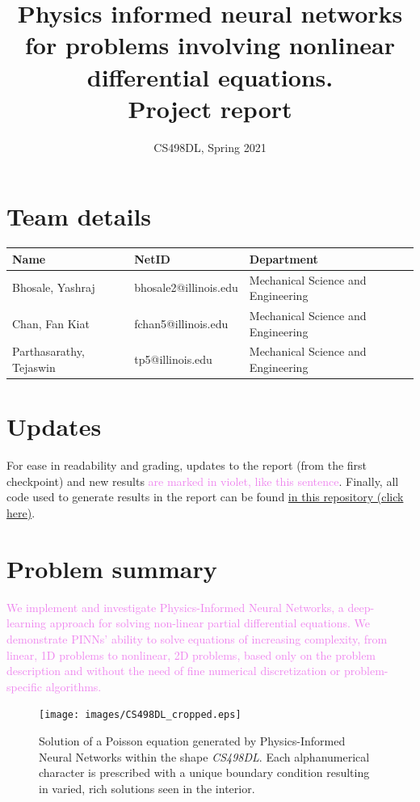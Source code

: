 \documentclass[11pt]{article}
\author{CS498DL, Spring 2021}
\date{}
\title{Physics informed neural networks for problems involving nonlinear differential equations.\\\medskip
\large Project report}
\newcommand{\newcontent}[1]{\textcolor{violet}{#1}}
\begin{document}
\maketitle

\section{Team details}
\label{sec:org6c892e9}
\begin{center}
\begin{tabular}{lll}
\toprule
Name & NetID & Department\\
\midrule
Bhosale, Yashraj & bhosale2@illinois.edu & Mechanical Science and Engineering\\
Chan, Fan Kiat & fchan5@illinois.edu & Mechanical Science and Engineering\\
Parthasarathy, Tejaswin & tp5@illinois.edu & Mechanical Science and Engineering\\
\bottomrule
\end{tabular}
\end{center}

\section{Updates}
\label{sec:org69da6f5}
For ease in readability and grading, updates to the report (from the first
checkpoint) and new results \newcontent{are marked in violet, like this}
\newcontent{sentence}. Finally, all code used to generate results in the report can be
found \href{https://github.com/fankiat/CS498DL-project}{in this repository (click here)}.

\section{Problem summary}
\label{sec:org6a1aaa6}
\newcontent{
We implement and investigate Physics-Informed Neural Networks, a deep-learning approach for solving non-linear
partial differential equations. We demonstrate PINNs' ability to solve
equations of increasing complexity, from linear, 1D problems to nonlinear, 2D
problems, based only on the problem description and without the need of fine
numerical discretization or problem-specific algorithms.
}

\begin{figure}[htbp]
\centering
\texttt{[image: images/CS498DL\_cropped.eps]}
\caption{\label{fig:cs498_poisson_results}Solution of a Poisson equation generated by Physics-Informed Neural Networks within the shape \emph{CS498DL}. Each alphanumerical character is prescribed with a unique boundary condition resulting in varied, rich solutions seen in the interior.}
\end{figure}
\end{document}
